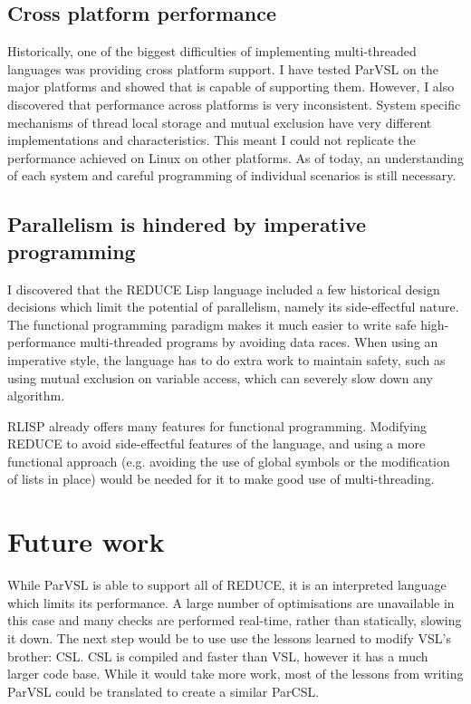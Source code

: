 \subsection{Cross platform performance}

Historically, one of the biggest difficulties of implementing multi-threaded languages
was providing cross platform support. I have tested ParVSL on the major platforms and
showed that is capable of supporting them. However, I also discovered that performance
across platforms is very inconsistent. System specific mechanisms of thread local storage
and mutual exclusion have very different implementations and characteristics. This meant
I could not replicate the performance achieved on Linux on other platforms. As of today,
an understanding of each system and careful programming of individual scenarios is still
necessary.

\subsection{Parallelism is hindered by imperative programming}

I discovered that the REDUCE Lisp language included a few historical design decisions which
limit the potential of parallelism, namely its side-effectful nature. The functional programming
paradigm makes it much easier to write safe high-performance multi-threaded programs by avoiding
data races. When using an imperative style, the language has to do extra work to maintain safety,
such as using mutual exclusion on variable access, which can severely slow down any algorithm.

RLISP already offers many features for functional programming.
Modifying REDUCE to avoid side-effectful features of the language, and using a more
functional approach (e.g. avoiding the use of global symbols or the modification
of lists in place) would be needed for it to make good use of multi-threading.

\section{Future work}

While ParVSL is able to support all of REDUCE, it is an interpreted language
which limits its performance. A large number of optimisations are unavailable in this
case and many checks are performed real-time, rather than statically, slowing it down.
The next step would be to use use the lessons learned to modify VSL's brother: CSL.
CSL is compiled and faster than VSL, however it has a much larger code base.
While it would take more work, most of the lessons from writing ParVSL could be translated
to create a similar ParCSL.

